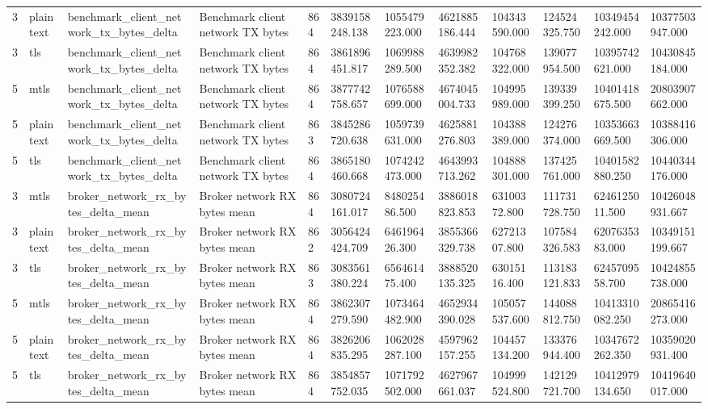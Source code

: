 \begin{longtable}{llllllllllll}
3 & plaintext & benchmark\_client\_network\_tx\_bytes\_delta & Benchmark client network TX bytes & 864 & 3839158248.138 & 1055479223.000 & 4621885186.444 & 104343590.000 & 124524325.750 & 10349454242.000 & 10377503947.000 \\
3 & tls & benchmark\_client\_network\_tx\_bytes\_delta & Benchmark client network TX bytes & 864 & 3861896451.817 & 1069988289.500 & 4639982352.382 & 104768322.000 & 139077954.500 & 10395742621.000 & 10430845184.000 \\
5 & mtls & benchmark\_client\_network\_tx\_bytes\_delta & Benchmark client network TX bytes & 864 & 3877742758.657 & 1076588699.000 & 4674045004.733 & 104995989.000 & 139339399.250 & 10401418675.500 & 20803907662.000 \\
5 & plaintext & benchmark\_client\_network\_tx\_bytes\_delta & Benchmark client network TX bytes & 863 & 3845286720.638 & 1059739631.000 & 4625881276.803 & 104388389.000 & 124276374.000 & 10353663669.500 & 10388416306.000 \\
5 & tls & benchmark\_client\_network\_tx\_bytes\_delta & Benchmark client network TX bytes & 864 & 3865180460.668 & 1074242473.000 & 4643993713.262 & 104888301.000 & 137425761.000 & 10401582880.250 & 10440344176.000 \\
3 & mtls & broker\_network\_rx\_bytes\_delta\_mean & Broker network RX bytes mean & 864 & 3080724161.017 & 848025486.500 & 3886018823.853 & 63100372.800 & 111731728.750 & 6246125011.500 & 10426048931.667 \\
3 & plaintext & broker\_network\_rx\_bytes\_delta\_mean & Broker network RX bytes mean & 862 & 3056424424.709 & 646196426.300 & 3855366329.738 & 62721307.800 & 107584326.583 & 6207635383.000 & 10349151199.667 \\
3 & tls & broker\_network\_rx\_bytes\_delta\_mean & Broker network RX bytes mean & 863 & 3083561380.224 & 656461475.400 & 3888520135.325 & 63015116.400 & 113183121.833 & 6245709558.700 & 10424855738.000 \\
5 & mtls & broker\_network\_rx\_bytes\_delta\_mean & Broker network RX bytes mean & 864 & 3862307279.590 & 1073464482.900 & 4652934390.028 & 105057537.600 & 144088812.750 & 10413310082.250 & 20865416273.000 \\
5 & plaintext & broker\_network\_rx\_bytes\_delta\_mean & Broker network RX bytes mean & 864 & 3826206835.295 & 1062028287.100 & 4597962157.255 & 104457134.200 & 133376944.400 & 10347672262.350 & 10359020931.400 \\
5 & tls & broker\_network\_rx\_bytes\_delta\_mean & Broker network RX bytes mean & 864 & 3854857752.035 & 1071792502.000 & 4627967661.037 & 104999524.800 & 142129721.700 & 10412979134.650 & 10419640017.000 \\

\end{longtable}

